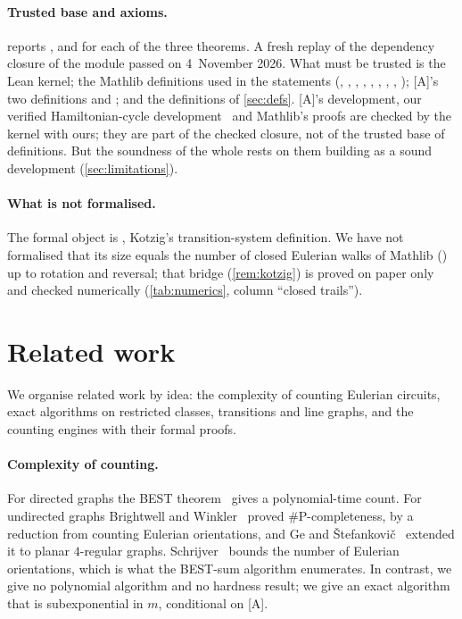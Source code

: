 \documentclass[10pt]{amsart}
\theoremstyle{plain}
\theoremstyle{definition}
\theoremstyle{remark}
\numberwithin{equation}{section}
\newcommand{\A}{\textup{[A]}}
\begin{document}
\paragraph{Trusted base and axioms.}  reports ,
 and  for each of the three theorems. A fresh
 replay of the dependency closure of the module
 passed on 4~November 2026. What must be trusted is the Lean
kernel; the Mathlib definitions used in the statements (, ,
, , , , , ,
); \A's two definitions  and
; and the definitions of \cref{sec:defs}. \A's development, our verified
Hamiltonian-cycle development~\cite{Tulsyan26} and Mathlib's proofs are checked by the kernel with ours;
they are part of the checked closure, not of the trusted base of definitions. But the soundness of the
whole rests on them building as a sound development (\cref{sec:limitations}).

\paragraph{What is not formalised.} The formal object is , Kotzig's
transition-system definition. We have not formalised that its size equals the number of closed
Eulerian walks of Mathlib () up to rotation and reversal; that
bridge (\cref{rem:kotzig}) is proved on paper only and checked numerically (\cref{tab:numerics},
column ``closed trails'').

\section{Related work}\label{sec:related}

We organise related work by idea: the complexity of counting Eulerian circuits, exact algorithms on
restricted classes, transitions and line graphs, and the counting engines with their formal proofs.

\paragraph{Complexity of counting.} For directed graphs the BEST theorem~\cite{BE51,ST41} gives a
polynomial-time count. For undirected graphs Brightwell and Winkler~\cite{BW05} proved
$\#$P-completeness, by a reduction from counting Eulerian orientations, and Ge and
\v{S}tefankovi\v{c}~\cite{GS10} extended it to planar $4$-regular graphs. Schrijver~\cite{Sch83}
bounds the number of Eulerian orientations, which is what the BEST-sum algorithm enumerates. In
contrast, we give no polynomial algorithm and no hardness result; we give an exact algorithm that is
subexponential in $m$, conditional on \A.
\end{document}
